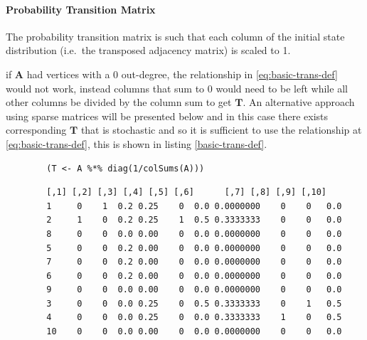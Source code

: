\documentclass[11pt]{article}
\begin{document}
\paragraph{Probability Transition Matrix}
\label{probability-transition-matrix}
The probability transition matrix is such that each column of the
initial state distribution (i.e. the transposed adjacency matrix) is
scaled to 1.

if \(\mathbf{A}\) had vertices with a 0 out-degree, the relationship in \eqref{eq:basic-trans-def} would not work, instead columns that sum to 0 would
need to be left while all other columns be divided by the column sum to get
\(\mathbf{T}\). An alternative approach using sparse matrices will be presented
below and in this case there exists corresponding \(\mathbf{T}\) that is
stochastic and so it is sufficient to use the relationship at
\eqref{eq:basic-trans-def}, this is shown in listing \ref{basic-trans-def}.

\begin{listing}[htbp]
    \begin{tcolorbox}
        \begin{verbatim}
        (T <- A %*% diag(1/colSums(A)))
        \end{verbatim}
        \caption{\label{basic-trans-def}Solve the Transition Probability Matrix by scaling each column to 1 using matrix multiplication.}
    \tcblower
        \begin{verbatim}
        [,1] [,2] [,3] [,4] [,5] [,6]      [,7] [,8] [,9] [,10]
        1     0    1  0.2 0.25    0  0.0 0.0000000    0    0   0.0
        2     1    0  0.2 0.25    1  0.5 0.3333333    0    0   0.0
        8     0    0  0.0 0.00    0  0.0 0.0000000    0    0   0.0
        5     0    0  0.2 0.00    0  0.0 0.0000000    0    0   0.0
        7     0    0  0.2 0.00    0  0.0 0.0000000    0    0   0.0
        6     0    0  0.2 0.00    0  0.0 0.0000000    0    0   0.0
        9     0    0  0.0 0.00    0  0.0 0.0000000    0    0   0.0
        3     0    0  0.0 0.25    0  0.5 0.3333333    0    1   0.5
        4     0    0  0.0 0.25    0  0.0 0.3333333    1    0   0.5
        10    0    0  0.0 0.00    0  0.0 0.0000000    0    0   0.0
        \end{verbatim}
    \end{tcolorbox}
\end{listing}
\end{document}
